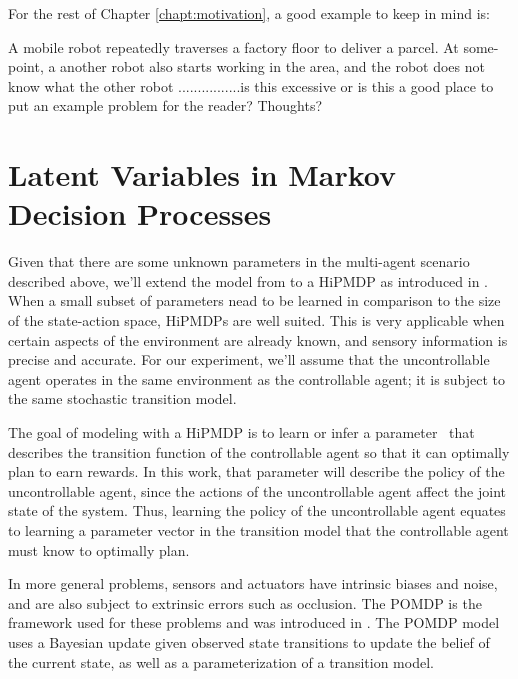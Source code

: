     For the rest of Chapter \ref{chapt:motivation}, a good example to keep in mind is:
    \begin{problem}
        A mobile robot repeatedly traverses a factory floor to deliver a parcel. At some-point, a another robot also
        starts working in the area, and the robot does not know what the other robot ................is this excessive
        or is this a good place to put an example problem for the reader? Thoughts?
    \end{problem}

\section{Latent Variables in Markov Decision Processes}\label{sec:literature_hipmdp}

    Given that there are some unknown parameters in the multi-agent scenario described above, we'll extend the model
    from  to a \ac{HiPMDP} as introduced in \cite{doshi2016hidden}. When a small subset of parameters nead to
    be learned in comparison to the size of the state-action space, \ac{HiPMDP}s are well suited.
    This is very applicable when certain aspects of the environment are already known, and sensory information is
    precise and accurate. For our experiment, we'll assume that the uncontrollable agent operates in the same
    environment as the controllable agent; it is subject to the same stochastic transition model.

    The goal of modeling with a \ac{HiPMDP} is to learn or infer a parameter \paramVec\ that describes the transition
    function of the controllable agent so that it can optimally plan to earn rewards. In this work, that parameter will
    describe the policy of the uncontrollable agent, since the actions of the uncontrollable agent affect the joint
    state of the system. Thus, learning the policy of the uncontrollable agent equates to learning a parameter vector in
    the transition model that the controllable agent must know to optimally plan.

    In more general problems,  sensors and actuators have intrinsic biases and noise, and are also subject to extrinsic
    errors such as occlusion. The \ac{POMDP} is the framework used for these problems and was introduced in
    \cite{kaelbling1998planning}. The \ac{POMDP} model uses a Bayesian update given observed state transitions to update
    the belief of the current state, as well as a parameterization of a transition model.

